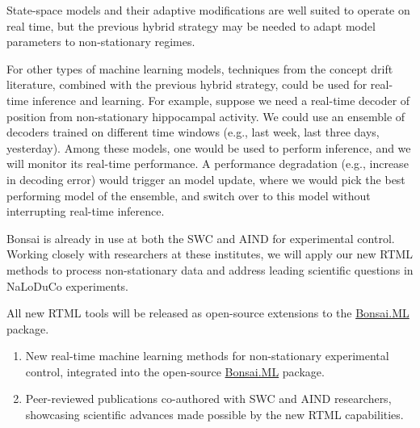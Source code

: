 State-space models and their adaptive modifications are well suited to operate
on real time, but the previous hybrid strategy may be needed to adapt
model parameters to non-stationary regimes.

For other types of machine learning models, techniques from the concept drift
literature, combined with the previous hybrid strategy, could be used for
real-time inference and learning.
%
For example, suppose we need a real-time decoder of position from
non-stationary hippocampal activity. We could use an ensemble of decoders
trained on different time windows (e.g., last week, last three days,
yesterday). Among these models, one would be used to perform inference, and we
will monitor its real-time performance. A performance degradation (e.g.,
increase in decoding error) would trigger an model update, where we would pick
the best performing model of the ensemble, and switch over to this model
without interrupting real-time inference.

Bonsai is already in use at both the SWC and AIND for experimental control. Working closely with researchers at these institutes, we will apply our new RTML methods to process non-stationary data and address leading scientific questions in NaLoDuCo experiments.

All new RTML tools will be released as open-source extensions to the \href{https://bonsai-rx.org/machinelearning/}{Bonsai.ML} package.


\begin{enumerate}
    \item New real-time machine learning methods for non-stationary experimental control, integrated into the open-source \href{https://bonsai-rx.org/machinelearning/}{Bonsai.ML} package.
    \item Peer-reviewed publications co-authored with SWC and AIND researchers, showcasing scientific advances made possible by the new RTML capabilities.
\end{enumerate}

